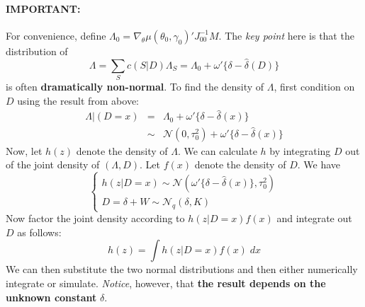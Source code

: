 \documentclass[12pt]{article}
\theoremstyle{definition}
\begin{document}
\paragraph{IMPORTANT:} For convenience, define $\Lambda_0 = \nabla_\theta \mu(\theta_0,\gamma_0)' J_{00}^{-1} M$. The \emph{key point} here is that the distribution of
	$$\Lambda = \sum_{S}c(S|D)\Lambda_S = \Lambda_0 + \omega'\{\delta - \hat{\delta}(D) \}$$
is often \textbf{dramatically non-normal}. To find the density of $\Lambda$, first condition on $D$ using the result from above:
	\begin{eqnarray*}
		\Lambda|(D=x) &=& \Lambda_0 + \omega'\{\delta - \hat{\delta}(x) \}\\
		 &\sim& \mathcal{N}(0,\tau_0^2) +  \omega'\{\delta - \hat{\delta}(x) \}
\end{eqnarray*}
Now, let $h(z)$ denote the density of $\Lambda$. We can calculate $h$ by integrating $D$ out of the joint density of $(\Lambda,D)$. Let $f(x)$ denote the density of $D$. We have
	$$
	\left\{\begin{array}{l}
		h(z|D=x) \sim \mathcal{N}\left( \omega'\{\delta - \hat{\delta}(x) \} , \tau_0^2\right)\\
		D = \delta + W \sim \mathcal{N}_q(\delta,K)
\end{array}\right.
$$
Now factor the joint density according to $h(z|D=x)f(x)$ and integrate out $D$ as follows:
	$$
	h(z) = \int h(z|D=x)f(x)\; dx
$$
We can then substitute the two normal distributions and then either numerically integrate or simulate. \emph{Notice}, however, that \textbf{the result depends on the unknown constant} $\delta$. 
\end{document}
